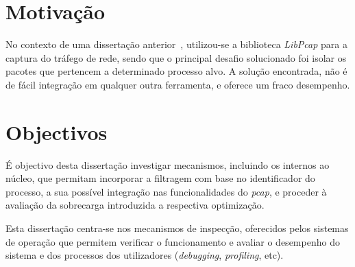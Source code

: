 \section{Motivação}
\label{sub:intro_motivation}

No contexto de uma dissertação anterior~\cite{Farruca:2009}, utilizou-se a biblioteca \textit{LibPcap} para a captura do tráfego de rede, sendo que o principal desafio solucionado foi isolar os pacotes que pertencem a determinado processo alvo.
A solução encontrada, não é de fácil integração em qualquer outra ferramenta, e oferece um fraco desempenho.


\section{Objectivos}
\label{sec:intro_goals}

É objectivo desta dissertação investigar mecanismos, incluindo os internos ao núcleo, que permitam incorporar a filtragem com base no identificador do processo, a sua possível integração nas funcionalidades do \textit{pcap}, e proceder à avaliação da sobrecarga introduzida a respectiva optimização.

Esta dissertação centra-se nos mecanismos de inspecção, oferecidos pelos sistemas de operação que permitem verificar o funcionamento e avaliar o desempenho do sistema e dos processos dos utilizadores (\textit{debugging}, \textit{profiling}, etc).





